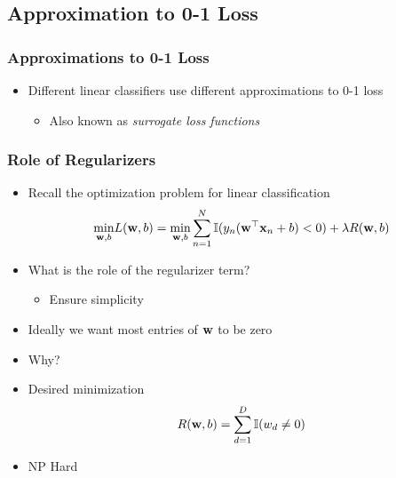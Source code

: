 \documentclass[10pt]{beamer}
\begin{document}
\subsection{Approximation to 0-1 Loss}
\begin{frame}
  \frametitle{Approximations to 0-1 Loss}
  \begin{itemize}
  \item Different linear classifiers use different approximations to 0-1 loss
    \begin{itemize}
    \item Also known as {\em surrogate loss functions}
    \end{itemize}
  \end{itemize}
  
\end{frame}
\begin{frame}
  \frametitle{Role of Regularizers}
  \begin{itemize}
  \item Recall the optimization problem for linear classification
    \[
    \underset{{\bf w},b}{\text{min}} L({\bf w},b) = \underset{{\bf w},b}{\text{min}} \sum_{n=1}^N\mathbb{I}(y_n({\bf w}^\top{\bf x}_n + b) < 0) + \lambda R({\bf w},b)
    \]
  \item What is the role of the regularizer term?
    \pause
    \begin{itemize}
    \item Ensure simplicity
    \end{itemize}
  \item Ideally we want most entries of ${\bf w}$ to be zero
  \item Why?
  \item Desired minimization
    \[
    R({\bf w},b) = \sum_{d=1}^D \mathbb{I}(w_d \neq 0)
    \]
  \item NP Hard
  \end{itemize}
\end{frame}
\end{document}
